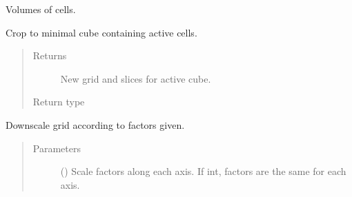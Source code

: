 \documentclass[letterpaper,10pt,english]{sphinxmanual}
\begin{document}
\begin{fulllineitems}

\begin{fulllineitems}
\label{\detokenize{api/grids:geology.src.OrthogonalUniformGrid.cell_volumes}}
Volumes of cells.

\end{fulllineitems}


\begin{fulllineitems}
\label{\detokenize{api/grids:geology.src.OrthogonalUniformGrid.crop_minimal_cube}}
Crop to minimal cube containing active cells.
\begin{quote}\begin{description}
\item[{Returns}] \leavevmode
{} \textendash{} New grid and slices for active cube.

\item[{Return type}] \leavevmode
{}

\end{description}\end{quote}

\end{fulllineitems}


\begin{fulllineitems}
\label{\detokenize{api/grids:geology.src.OrthogonalUniformGrid.downscale}}
Downscale grid according to factors given.
\begin{quote}\begin{description}
\item[{Parameters}] \leavevmode
{} (\sphinxstyleliteralemphasis{\sphinxupquote{, }}) \textendash{} Scale factors along each axis. If int, factors are the same for each axis.


\end{description}
\end{quote}
\end{fulllineitems}
\end{fulllineitems}
\end{document}
